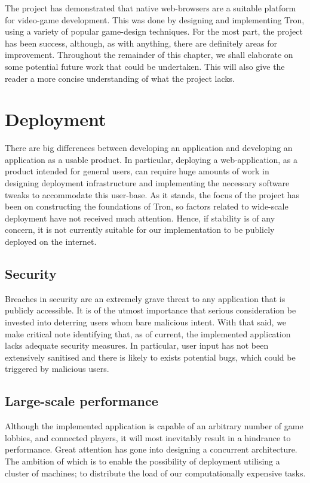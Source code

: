 \documentclass{standalone}
\begin{document}
	The project has demonstrated that native web-browsers are a suitable platform for video-game development. This was done by designing and implementing Tron, using a variety of popular game-design techniques. For the most part, the project has been success, although, as with anything, there are definitely areas for improvement. Throughout the remainder of this chapter, we shall elaborate on some potential future work that could be undertaken. This will also give the reader a more concise understanding of what the project lacks.

	\section{Deployment}
		There are big differences between developing an application and developing an application as a usable product. In particular, deploying a web-application, as a product intended for general users, can require huge amounts of work in designing deployment infrastructure and implementing the necessary software tweaks to accommodate this  user-base. As it stands, the focus of the project has been on constructing the foundations of Tron, so factors related to wide-scale deployment have not received much attention. Hence, if stability is of any concern, it is not currently suitable for our implementation to be publicly deployed on the internet.

		\subsection{Security}
			Breaches in security are an extremely grave threat to any application that is publicly accessible. It is of the utmost importance that serious consideration be invested into deterring users whom bare malicious intent. With that said, we make critical note identifying that, as of current, the implemented application lacks adequate security measures. In particular, user input has not been extensively sanitised and there is likely to exists potential bugs, which could be triggered by malicious users.

		\subsection{Large-scale performance}
			Although the implemented application is capable of an arbitrary number of game lobbies, and connected players, it will most inevitably result in a hindrance to performance. Great attention has gone into designing a concurrent architecture. The ambition of which is to enable the possibility of deployment utilising a cluster of machines; to distribute the load of our computationally expensive tasks.
\end{document}
